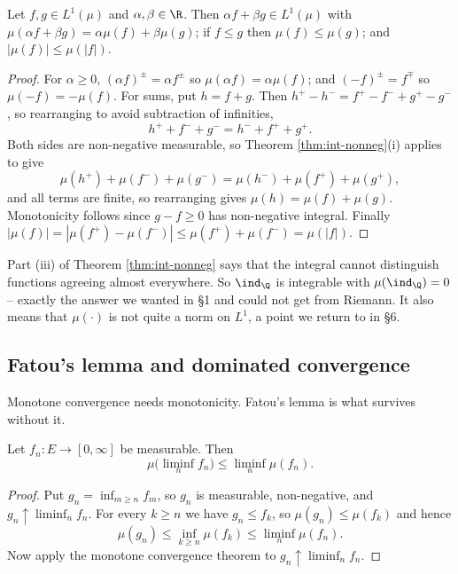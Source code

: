 \begin{theorem}\label{thm:int-gen}
	Let $f, g \in L^1(\mu)$ and $\alpha,\beta \in \R$. Then $\alpha f + \beta g \in L^1(\mu)$ with $\mu(\alpha f + \beta g) = \alpha \mu(f)+\beta\mu(g)$; if $f \leq g$ then $\mu(f) \leq \mu(g)$; and $|\mu(f)| \leq \mu(|f|)$.
\end{theorem}
\begin{proof}
	For $\alpha \geq 0$, $(\alpha f)^\pm = \alpha f^\pm$ so $\mu(\alpha f) = \alpha\mu(f)$; and $(-f)^\pm = f^\mp$ so $\mu(-f) = -\mu(f)$. For sums, put $h = f+g$. Then $h^+ - h^- = f^+ - f^- + g^+ - g^-$, so rearranging to avoid subtraction of infinities,
	$$
	h^+ + f^- + g^- = h^- + f^+ + g^+.
	$$
	Both sides are non-negative measurable, so Theorem \ref{thm:int-nonneg}(i) applies to give
	$$
	\mu(h^+)+\mu(f^-)+\mu(g^-) = \mu(h^-)+\mu(f^+)+\mu(g^+),
	$$
	and all terms are finite, so rearranging gives $\mu(h) = \mu(f)+\mu(g)$. Monotonicity follows since $g - f \geq 0$ has non-negative integral. Finally $|\mu(f)| = |\mu(f^+)-\mu(f^-)| \leq \mu(f^+)+\mu(f^-) = \mu(|f|)$.
\end{proof}

\begin{remark}
	Part (iii) of Theorem \ref{thm:int-nonneg} says that the integral cannot distinguish functions agreeing almost everywhere. So $\ind_\Q$ is integrable with $\mu(\ind_\Q) = 0$ -- exactly the answer we wanted in \S1 and could not get from Riemann. It also means that $\mu(\cdot)$ is not quite a norm on $L^1$, a point we return to in \S6.
\end{remark}

\subsection{Fatou's lemma and dominated convergence}

Monotone convergence needs monotonicity. Fatou's lemma is what survives without it.

\begin{lemma}[Fatou]\label{lem:fatou}
	Let $f_n : E \to [0,\infty]$ be measurable. Then
	$$
	\mu\big( \liminf_n f_n \big) \leq \liminf_n \mu(f_n).
	$$
\end{lemma}
\begin{proof}
	Put $g_n = \inf_{m\geq n} f_m$, so $g_n$ is measurable, non-negative, and $g_n \uparrow \liminf_n f_n$. For every $k \geq n$ we have $g_n \leq f_k$, so $\mu(g_n) \leq \mu(f_k)$ and hence
	$$
	\mu(g_n) \leq \inf_{k \geq n}\mu(f_k) \leq \liminf_n \mu(f_n).
	$$
	Now apply the monotone convergence theorem to $g_n \uparrow \liminf_n f_n$.
\end{proof}

